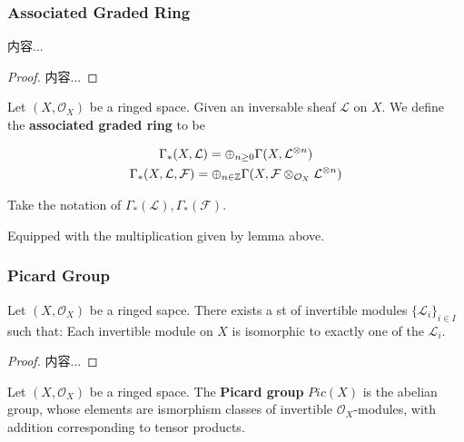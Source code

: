 \documentclass[Total.tex]{subfiles}
\begin{document}
			
			\subsubsection{Associated Graded Ring}
			
				\begin{lemma}
					内容...
				\end{lemma}
				
				\begin{proof}
					内容...
				\end{proof}
			
				\begin{Def}
					Let $(X,\mathcal{O}_X)$ be a ringed space. Given an inversable sheaf $\mathcal{L}$ on $X$. We define the \textbf{associated graded ring} to be
					
					\begin{gather*}
						\Gamma_*(X,\mathcal{L})=\oplus_{n\geq 0} \Gamma(X,\mathcal{L}^{\otimes n})\\
						\Gamma_*(X,\mathcal{L},\mathcal{F})=\oplus_{n\in \mathbb{Z}} \Gamma(X,\mathcal{F}\otimes_{\mathcal{O}_X} \mathcal{L}^{\otimes n})
					\end{gather*}
					
					Take the notation of $\Gamma_*(\mathcal{L}),\Gamma_*(\mathcal{F})$.
				\end{Def}
				Equipped with the multiplication given by lemma above.
			\subsubsection{Picard Group}
				\begin{lemma}
					Let $(X,\mathcal{O}_X)$ be a ringed sapce. There exists a st of invertible modules $\{\mathcal{L}_i\}_{i\in I}$ such that: Each invertible module on $X$ is isomorphic to exactly one of the $\mathcal{L}_i$.
				\end{lemma}
				\begin{proof}
					内容...
				\end{proof}
			
				\begin{Def}
					Let $(X,\mathcal{O}_X)$ be a ringed space. The \textbf{Picard group} $Pic(X)$ is the abelian group, whose elements are ismorphism classes of invertible $\mathcal{O}_X$-modules, with addition corresponding to tensor products.
				\end{Def}
					
\end{document}

